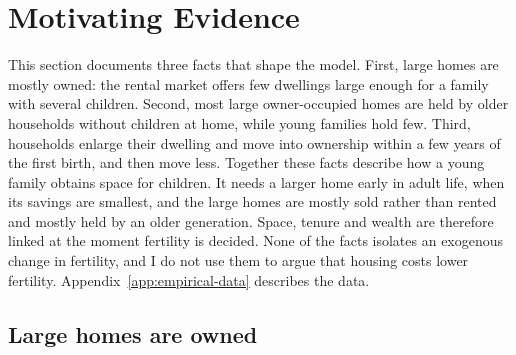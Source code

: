 \providecommand{\mocktodo}[1]{\textcolor{red}{[TODO: #1]}}

\section{Motivating Evidence}
\label{sec:empirical-evidence}

This section documents three facts that shape the model. First, large homes
are mostly owned: the rental market offers few dwellings large enough for a
family with several children. Second, most large owner-occupied homes are held
by older households without children at home, while young families hold few.
Third, households enlarge their dwelling and move into ownership within a few
years of the first birth, and then move less. Together these facts describe
how a young family obtains space for children. It needs a larger home early
in adult life, when its savings are smallest, and the large homes are mostly
sold rather than rented and mostly held by an older generation. Space,
tenure and wealth are therefore linked at the moment fertility is decided.
None of the facts isolates an exogenous change in fertility, and I do not use
them to argue that housing costs lower fertility.
Appendix~\ref{app:empirical-data} describes the data.

\subsection{Large homes are owned}

